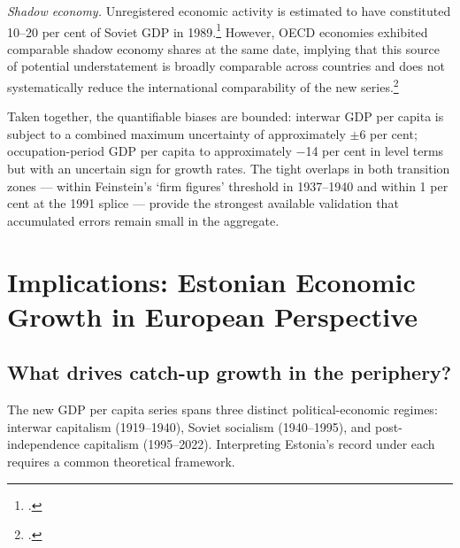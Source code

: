 \documentclass[12pt,a4paper]{article}
\begin{document}
\textit{Shadow economy.} Unregistered economic activity is estimated to have constituted 10--20 per cent of Soviet GDP in 1989.\footnote{\autocite[5]{baltictransitioncontraction}.} However, OECD economies exhibited comparable shadow economy shares at the same date, implying that this source of potential understatement is broadly comparable across countries and does not systematically reduce the international comparability of the new series.\footnote{\autocite[90--91]{shadow_europe}.}

Taken together, the quantifiable biases are bounded: interwar GDP per capita is subject to a combined maximum uncertainty of approximately $\pm$6 per cent; occupation-period GDP per capita to approximately $-$14 per cent in level terms but with an uncertain sign for growth rates. The tight overlaps in both transition zones — within Feinstein's `firm figures' threshold in 1937--1940 and within 1 per cent at the 1991 splice — provide the strongest available validation that accumulated errors remain small in the aggregate.

\section{Implications: Estonian Economic Growth in European Perspective}
\label{sec:implications}

\subsection{What drives catch-up growth in the periphery?}
\label{subsec:theory}

%

The new GDP per capita series spans three distinct political-economic regimes: interwar capitalism (1919--1940), Soviet socialism (1940--1995), and post-independence capitalism (1995--2022). Interpreting Estonia's record under each requires a common theoretical framework.
\end{document}
